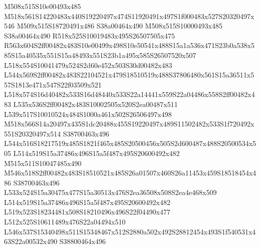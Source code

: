 \documentclass{article}
\begin{document}
\begin{multicols}{2}
M508x515S10e00493x485 M518x561S14220483x440S19220497x474S11920491x497S1f000483x527S20320497x546 M509x515S18720491x486 S38a00464x490 M508x515S10000493x485 S38a00464x490 R518x525S10019483x495S26507505x475 R563x604S2ff00482x483S10e00499x498S10e50541x488S15a1a536x471S23b0a538x585S15a40535x551S15a48493x551S23b1a495x585S26507520x507 L518x554S10041479x524S2d60e452x503S30d00482x483 L544x569S2ff00482x483S22104521x479S18510519x488S37806480x561S15a36511x557S1813e471x547S22f03509x521 L518x574S16d40482x533S16d48440x533S22a14441x559S22a04486x558S2ff00482x483 L535x536S2ff00482x483S10002505x520S2ea00487x511 L539x517S10010524x484S1000a461x502S26506497x498 M518x566S14a20497x435S1dc20488x455S19220497x489S11502482x533S1f720492x551S20320497x514 S38700463x496 L544x516S18217519x485S1821f465x485S20500456x505S2d600487x488S20500534x505 L514x519S15a37486x496S15a5f487x495S20600492x482 M515x511S10047485x490 M546x518S2ff00482x483S18510521x485S26a01507x460S26a11453x459S18518454x486 S38700463x496 L533x524S15a30475x477S15a30513x476S2ea36508x508S2ea4e468x509 L514x519S15a37486x496S15a5f487x495S20600492x482 L519x523S18234481x508S18210496x496S22f04490x477 L512x525S10611489x476S22a04494x510 L546x537S15340498x511S15348467x512S2880a502x492S28812454x493S1f540531x463S22a00532x490 S38800464x496










\end{multicols}
\end{document}
